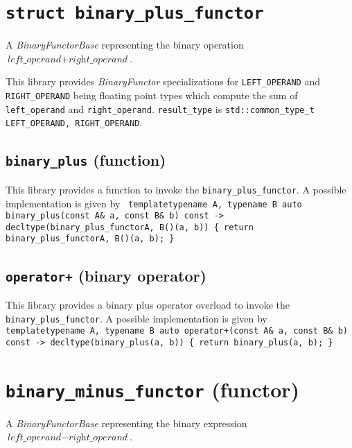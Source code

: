 \documentclass[oneside]{book}
\begin{document}


\section{\texttt{struct binary\_plus\_functor}}
A \textit{BinaryFunctorBase} representing the binary operation $\textit{left\_operand} + \textit{right\_operand}$.\newline

\noindent{}This library provides \textit{BinaryFunctor}       specializations for
\texttt{LEFT\_OPERAND} and \texttt{RIGHT\_OPERAND} being     floating point types
which compute  the sum    of  \texttt{left\_operand} and \texttt{right\_operand}.
\texttt{result\_type} is \texttt{std::common\_type\_t  \textlangle LEFT\_OPERAND,
RIGHT\_OPERAND\textrangle}.

\subsection{\texttt{binary\_plus} (function)}
This library provides a function to invoke the \texttt{binary\_plus\_functor}.
A possible implementation is given by\newline
\texttt{
template\textlangle typename A, typename B\textrangle\newline
auto binary\_plus(const A\& a, const B\& b) const -> decltype(binary\_plus\_functor\textlangle A, B\textrangle()(a, b))\newline
\{ return binary\_plus\_functor\textlangle A, B\textrangle()(a, b); \}
}

\subsection{\texttt{operator+} (binary operator)}
This library provides a binary plus operator overload to invoke the \texttt{binary\_plus\_functor}.
A possible implementation is given by\newline
\texttt{
template\textlangle typename A, typename B\textrangle\newline
auto operator+(const A\& a, const B\& b) const -> decltype(binary\_plus(a, b))\newline
\{ return binary\_plus(a, b); \}
}

\section{\texttt{binary\_minus\_functor} (functor)}
A \textit{BinaryFunctorBase} representing the binary expression $\textit{left\_operand} - \textit{right\_operand}$.\newline
\end{document}
